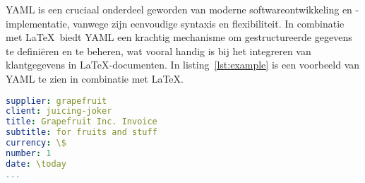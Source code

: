 YAML is een cruciaal onderdeel geworden van moderne softwareontwikkeling en -implementatie, vanwege zijn eenvoudige syntaxis en flexibiliteit.
In combinatie met \LaTeX\ biedt YAML een krachtig mechanisme om gestructureerde gegevens te definiëren en te beheren, wat vooral handig is bij het integreren van klantgegevens in \LaTeX-documenten.
In listing~\ref{lst:example} is een voorbeeld van YAML te zien in combinatie met \LaTeX.

\begin{lstlisting}[language=YAML,caption={\ttfamily invoice-001.yaml},label={lst:example}]
supplier: grapefruit
client: juicing-joker
title: Grapefruit Inc. Invoice
subtitle: for fruits and stuff
currency: \$
number: 1
date: \today
...
\end{lstlisting}


